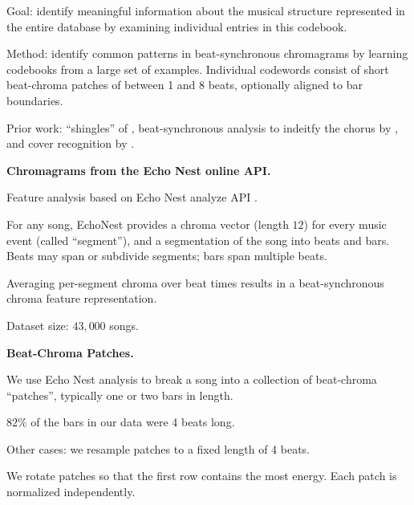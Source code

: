 \documentclass[portrait,a0b,final]{a0poster}
\newenvironment{poster}{
  \begin{center}
  \begin{minipage}[c]{0.98\textwidth}
}{
  \end{minipage} 
  \end{center}
}
\newcommand{\pbox}[4]{
\psshadowbox[#3]{
\begin{minipage}[t][#2][t]{#1}
#4
\end{minipage}
}}
\begin{document}
\begin{poster}
\begin{multicols}{3}
%
\begin{list}{}{\leftmargin=2em =1em}
\item Goal: identify meaningful information
about the musical structure represented in the entire database by
examining individual entries in this codebook.
\item Method: identify common patterns in beat-synchronous
chromagrams by learning codebooks from a large set of examples.
Individual codewords consist of short beat-chroma patches of
between 1 and 8 beats, optionally aligned to bar boundaries.
\item Prior work: ``shingles'' of \cite{Casey2007}, 
beat-synchronous analysis to indeitfy the chorus by \cite{Bartsch2001},
and cover recognition by \cite{Ellis2007a}.
\end{list}

\vspace{1.5cm}
\begin{center}
  \pbox{0.8\columnwidth}{}{linewidth=2mm,framearc=0.1,linecolor=lightred,fillstyle=gradient,gradangle=0,gradbegin=white,gradend=whitepink,gradmidpoint=1.0,framesep=1em}{
    \begin{center}
      \large Audio Features - Echo Nest
    \end{center}}
\end{center}

\vspace{1.0cm}

\textbf{Chromagrams from the Echo Nest online API.}
\begin{list}{}{\leftmargin=2em =1em}
\item Feature analysis based on Echo Nest analyze API \cite{EchoNest}.
\item For any song, EchoNest provides a chroma
vector (length $12$) for every music event (called ``segment''), and a
segmentation of the song into beats and bars. Beats may span or 
subdivide segments; bars span multiple beats.
\item Averaging per-segment chroma over beat times results in a
beat-synchronous chroma feature representation.
\item Dataset size: $43,000$ songs.
\end{list}

\textbf{Beat-Chroma Patches.}
\begin{list}{}{\leftmargin=2em =1em}
\item We use Echo Nest analysis to break a song into a collection of 
beat-chroma ``patches'', typically one or two bars in length.
\item $82\%$ of the bars in our data were 4 beats long.
\item Other cases: we resample patches to a fixed length of 4 beats.
\item We rotate patches so that the first row contains the most energy.
Each patch is normalized independently.
\end{list}



\end{multicols}
\end{poster}
\end{document}
